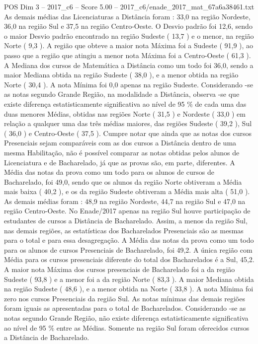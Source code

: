 \begin{textsample}{POS Dim 3 – 2017\_c6 – Score 5.00 – 2017\_c6/enade\_2017\_mat\_67a6a38461.txt}
As demais médias das Licenciaturas a Distância foram : 33,0 na região Nordeste, 36,0 na região Sul e 37,5 na região Centro-Oeste.
O Desvio padrão foi 12,6, sendo o maior Desvio padrão encontrado na região Sudeste ( 13,7 ) e o menor, na região Norte ( 9,3 ).
A região que obteve a maior nota Máxima foi a Sudeste ( 91,9 ), ao passo que a região que atingiu a menor nota Máxima foi a Centro-Oeste ( 61,3 ).
A Mediana dos cursos de Matemática a Distância como um todo foi 36,0, sendo a maior Mediana obtida na região Sudeste ( 38,0 ), e a menor obtida na região Norte ( 30,4 ).
A nota Mínima foi 0,0 apenas na região Sudeste.
Considerando -se as notas segundo Grande Região, na modalidade a Distância, observa -se que existe diferença estatisticamente significativa ao nível de 95 \% de cada uma das duas menores Médias, obtidas nas regiões Norte ( 31,5 ) e Nordeste ( 33,0 ) em relação a qualquer uma das três médias maiores, das regiões Sudeste ( 39,2 ), Sul ( 36,0 ) e Centro-Oeste ( 37,5 ).
Cumpre notar que ainda que as notas dos cursos Presenciais sejam comparáveis com as dos cursos a Distância dentro de uma mesma Habilitação, não é possível comparar as notas obtidas pelos alunos de Licenciatura e de Bacharelado, já que as provas são, em parte, diferentes.
A Média das notas da prova como um todo para os alunos de cursos de Bacharelado, foi 49,0, sendo que os alunos da região Norte obtiveram a Média mais baixa ( 40,2 ), e os da região Sudeste obtiveram a Média mais alta ( 51,0 ).
As demais médias foram : 48,9 na região Nordeste, 44,7 na região Sul e 47,0 na região Centro-Oeste.
No Enade/2017 apenas na região Sul houve participação de estudantes de cursos a Distância de Bacharelado.
Assim, a menos da região Sul, nas demais regiões, as estatísticas dos Bacharelados Presenciais são as mesmas para o total e para essa desagregação.
A Média das notas da prova como um todo para os alunos de cursos Presenciais de Bacharelado, foi 49,2.
A única região com Média para os cursos presenciais diferente do total dos Bacharelados é a Sul, 45,2.
A maior nota Máxima dos cursos presenciais de Bacharelado foi a da região Sudeste ( 93,8 ) e a menor foi a da região Norte ( 83,3 ).
A maior Mediana obtida na região Sudeste ( 48,6 ), e a menor obtida na Norte ( 33,8 ).
A nota Mínima foi zero nos cursos Presenciais da região Sul.
As notas mínimas das demais regiões foram iguais as apresentadas para o total de Bacharelados.
Considerando -se as notas segundo Grande Região, não existe diferença estatisticamente significativa ao nível de 95 \% entre as Médias.
Somente na região Sul foram oferecidos cursos a Distância de Bacharelado.

\end{textsample}
